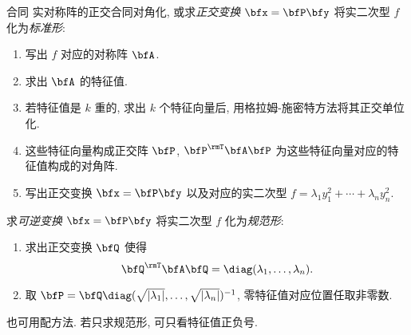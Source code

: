 \documentclass[aspectratio=169,handout]{ctexbeamer}
\begin{document}
\begin{frame}{合同}
	\onslide<+->
	实对称阵的正交合同对角化, 或求\emph{正交变换} $\bfx=\bfP\bfy$ 将实二次型 $f$ 化为\emph{标准形}:
	\begin{enumerate}
		\item 写出 $f$ 对应的对称阵 $\bfA$.
		\item 求出 $\bfA$ 的特征值.
		\item \alert{若特征值是 $k$ 重的, 求出 $k$ 个特征向量后, 用格拉姆-施密特方法将其正交单位化.}
		\item 这些特征向量构成正交阵 $\bfP$, $\bfP^\rmT\bfA\bfP$ 为这些特征向量对应的特征值构成的对角阵.
		\item 写出正交变换 $\bfx=\bfP\bfy$ 以及对应的实二次型  $f=\lambda_1 y_1^2+\cdots+\lambda_n y_n^2$.
	\end{enumerate}

	\onslide<+->
	求\emph{可逆变换} $\bfx=\bfP\bfy$ 将实二次型 $f$ 化为\emph{规范形}:
	\begin{enumerate}
		\item 求出正交变换 $\bfQ$ 使得
		\[\bfQ^\rmT\bfA\bfQ=\diag(\lambda_1,\dots,\lambda_n).\]
		\item 取 $\bfP=\bfQ\diag(\sqrt{|\lambda_1|},\dots,\sqrt{|\lambda_n|})^{-1}$, 零特征值对应位置任取非零数.
	\end{enumerate}
	也可用配方法. 若只求规范形, 可只看特征值正负号.
\end{frame}
\end{document}
